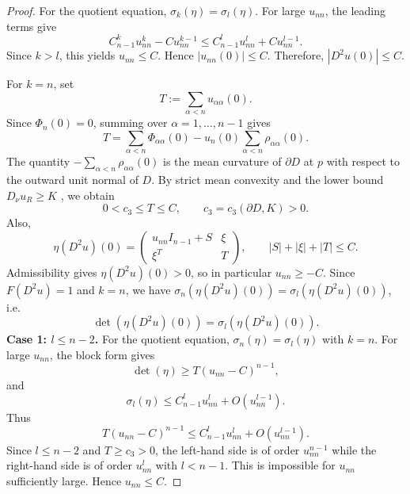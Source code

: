 \documentclass[reqno,a4paper]{amsart}
\numberwithin{equation}{section}
\begin{document}
\begin{proof}
		For the quotient equation, $\sigma_k(\eta) = \sigma_l(\eta)$. For large $u_{nn}$, the leading terms give
		\[
		C_{n-1}^k  u_{nn}^k - C u_{nn}^{k-1} \le C_{n-1}^l  u_{nn}^l + C u_{nn}^{l-1}.
		\]
		Since $k > l$, this yields $u_{nn} \le C$. Hence $|u_{nn}(0)| \le C$. Therefore, $|D^2 u(0)| \le C$.
		
		For $k=n$, set
		\[
		T := \sum_{\alpha < n} u_{\alpha\alpha}(0).
		\]
		Since $\Phi_n(0) = 0$, summing  over $\alpha = 1, \dots, n-1$ gives
		\[
		T = \sum_{\alpha < n} \Phi_{\alpha\alpha}(0) - u_n(0) \sum_{\alpha < n} \rho_{\alpha\alpha}(0).
		\]
		The quantity $-\sum_{\alpha < n} \rho_{\alpha\alpha}(0)$ is the mean curvature of $\partial D$ at $p$ with respect to the outward unit normal of $D$. By strict mean convexity and the lower bound $D_\nu u_R \ge K$ , we obtain
		\[
		0 < c_3 \le T \le C, \qquad c_3 = c_3(\partial D, K) > 0.
		\]
		Also,
		\[
		\eta(D^2 u)(0) = \begin{pmatrix}
			u_{nn} I_{n-1} + S & \xi \\
			\xi^T & T
		\end{pmatrix},
		\qquad |S| + |\xi|+|T| \le C.
		\]
		Admissibility gives $\eta(D^2 u)(0) > 0$, so in particular $u_{nn} \ge -C$. Since $F(D^2 u) = 1$ and $k=n$, we have $\sigma_n(\eta(D^2 u)(0)) = \sigma_l(\eta(D^2 u)(0))$, i.e.
		\[
		\det(\eta(D^2 u)(0)) = \sigma_l(\eta(D^2 u)(0)).
		\]
		\noindent\textbf{Case 1: $l \le n-2$.}
		For the quotient equation, $\sigma_n(\eta) = \sigma_l(\eta)$ with $k=n$.
		For large $u_{nn}$, the block form gives
		\[
		\det(\eta) \ge T (u_{nn} - C)^{n-1},
		\]
		and
		\[
		\sigma_l(\eta) \le C_{n-1}^l u_{nn}^l + O(u_{nn}^{l-1}).
		\]
		Thus
		\[
		T (u_{nn} - C)^{n-1} \le C_{n-1}^l u_{nn}^l + O(u_{nn}^{l-1}).
		\]
		Since $l \le n-2$ and $T \ge c_3 > 0$, the left-hand side is of order $u_{nn}^{n-1}$ while the right-hand side is of order $u_{nn}^l$ with $l < n-1$. This is impossible for $u_{nn}$ sufficiently large. Hence $u_{nn} \le C$.
		
		
		

\end{proof}
\end{document}
